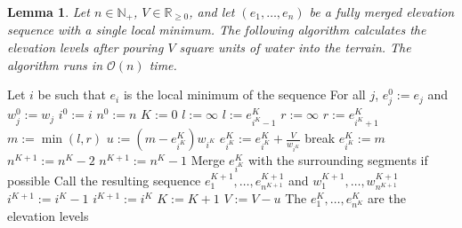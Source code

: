 \documentclass[11pt,a4paper]{article}
\newtheorem{lem}{Lemma}
\newcommand{\Np}{\mathbb{N}_+}
\newcommand{\bO}{\mathcal{O}}
\newcommand{\Rnn}{\mathbb{R}_{\ge0}}
\begin{document}
\begin{lem}
    \label{alg1}
    Let $n\in\Np$, $V\in\Rnn$, and let $(e_1,\ldots,e_n)$ be a fully merged elevation sequence with a single local minimum.
    The following algorithm calculates the elevation levels after pouring $V$ square units of water into the terrain.
    The algorithm runs in $\bO(n)$ time.
\end{lem}

\vspace{1em}

\begin{algorithmic}[1]
    \State Let $i$ be such that $e_i$ is the local minimum of the sequence\; \label{a1:minimum}
    \State For all $j$, $e_j^0 := e_j$ and $w_j^0 := w_j$
    \State $i^0 := i$
    \State $n^0 := n$
    \State $K := 0$
     \label{a1:while}
        \State $l := \infty$
            \State $l := e_{i^K-1}^K$
        \EndIf
        \State $r := \infty$
            \State $r := e_{i^K+1}^K$
        \EndIf
        \State $m := \min(l, r)$
        \State $u := (m-e_{i^K}^K)w_{i^K}$
         \label{a1:vleu}
            \State $e_{i^K}^K := e_{i^K}^K + \frac{V}{w_{i^K}}$ \label{a1:vplus}
            \State break \label{a1:break}
        \EndIf
        \State $e_{i^K}^K := m$ \label{a1:newe}
         \label{a1:leqr}
            \State $n^{K+1} := n^K - 2$ \label{a1:min2}
        \Else
            \State $n^{K+1} := n^K - 1$ \label{a1:min1}
        \EndIf
        \State Merge $e_{i^K}^K$ with the surrounding segments if possible \label{a1:merge}
        \State Call the resulting sequence $e_1^{K+1},\ldots,e_{n^{K+1}}^{K+1}$ and $w_1^{K+1},\ldots,w_{n^{K+1}}^{K+1}$
         \label{a1:ller}
            \State $i^{K+1} := i^K - 1$ \label{a1:imin1}
        \Else
            \State $i^{K+1} := i^K$ \label{a1:imin0}
        \EndIf
        \State $K := K + 1$
        \State $V := V - u$
    \EndWhile
    \State The $e_1^K,\ldots,e_{n^K}^K$ are the elevation levels
\end{algorithmic}
\end{document}
